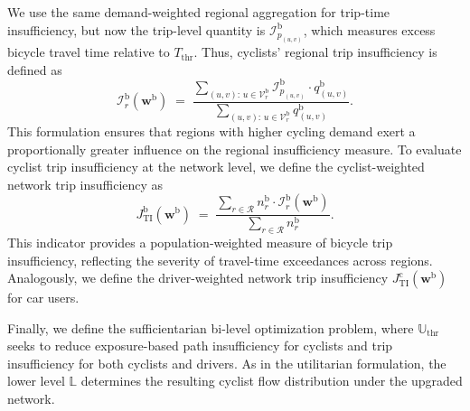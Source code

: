\documentclass[lettersize,journal]{IEEEtran}
\begin{document}
We use the same demand-weighted regional aggregation for trip-time
insufficiency, but now the trip-level quantity is
$\mathcal{I}_{p_{(u,v)}}^\mathrm{b}$, which measures excess bicycle travel time
relative to $T_{\mathrm{thr}}$. Thus, cyclists' regional trip insufficiency is
defined as
\begin{equation}
\label{eq:region_insuff_time}
\mathcal{I}^\mathrm{b}_r(\boldsymbol{w}^\mathrm{b})
\;=\;
\frac{
\sum_{(u,v):\,u\in\mathcal{V}_r^\mathrm{b}}
\mathcal{I}_{p_{(u,v)}}^\mathrm{b} \cdot q^\mathrm{b}_{(u,v)}
}{
\sum_{(u,v):\,u\in\mathcal{V}_r^\mathrm{b}}
q^\mathrm{b}_{(u,v)}
}.
\end{equation}
This formulation ensures that regions with higher cycling demand exert a proportionally greater influence on the regional insufficiency measure. To evaluate cyclist trip insufficiency at the network level, we define the cyclist-weighted network trip insufficiency as
\begin{equation}
\label{eq:network_insuff_time}
J_{\mathrm{TI}}^\mathrm{b}(\boldsymbol{w}^\mathrm{b})
\;=\;
\frac{
\sum_{r\in\mathcal{R}}
n_r^\mathrm{b} \cdot \mathcal{I}_r^\mathrm{b}(\boldsymbol{w}^\mathrm{b})
}{
\sum_{r\in\mathcal{R}} n_r^\mathrm{b}
}.
\end{equation}
This indicator provides a population-weighted measure of bicycle trip insufficiency, reflecting the severity of travel-time exceedances across regions. Analogously, we define the driver-weighted network trip insufficiency $J_{\mathrm{TI}}^\mathrm{c}(\boldsymbol{w}^\mathrm{b}) $ for car users.

Finally, we define the sufficientarian bi-level optimization problem, where $\mathbb{U}_{\text{thr}}$ seeks to reduce exposure-based path insufficiency for cyclists and trip insufficiency for both cyclists and drivers. As in the utilitarian formulation, the lower level $\mathbb{L}$ determines the resulting cyclist flow distribution under the upgraded network.
\end{document}
